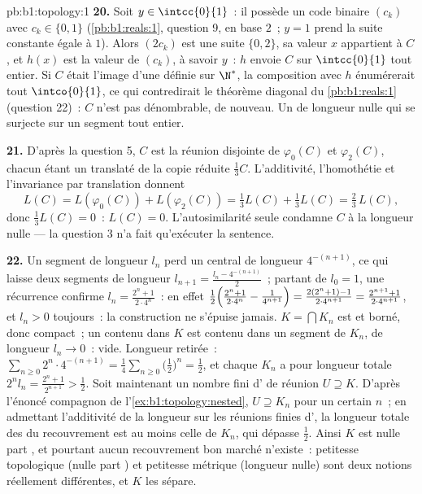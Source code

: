\begin{solution}{pb:b1:topology:1}
\textbf{20.} Soit $y \in \intcc{0}{1}$~: il possède un code binaire
$(c_k)$ avec $c_k \in \{0, 1\}$ (\cref{pb:b1:reals:1}, question
9, en base $2$~; $y = 1$ prend la suite constante égale à $1$). Alors
$(2c_k)$ est une suite $\{0,2\}$, sa valeur $x$ appartient à $C$, et
$h(x)$ est la valeur de $(c_k)$, à savoir $y$~: $h$ envoie $C$ sur
$\intcc{0}{1}$ tout entier. Si $C$ était l'image d'une 
définie sur $\N^*$, la composition avec $h$ énumérerait tout
$\intco{0}{1}$, ce qui contredirait le théorème diagonal du
\cref{pb:b1:reals:1} (question 22)~: $C$ n'est pas dénombrable, de
nouveau. Un  de longueur nulle qui se surjecte sur un segment
tout entier.

\textbf{21.} D'après la question 5, $C$ est la réunion disjointe de
$\varphi_0(C)$ et $\varphi_2(C)$, chacun étant un translaté de la
copie réduite $\frac13 C$. L'additivité, l'homothétie et l'invariance
par translation donnent
\[
L(C) = L(\varphi_0(C)) + L(\varphi_2(C))
= \tfrac13 L(C) + \tfrac13 L(C) = \tfrac23\,L(C),
\]
donc $\frac13 L(C) = 0$~: $L(C) = 0$. L'autosimilarité seule condamne
$C$ à la longueur nulle --- la question 3 n'a fait qu'exécuter la
sentence.

\textbf{22.} Un segment de longueur $l_n$ perd un  central
de longueur $4^{-(n+1)}$, ce qui laisse deux segments de longueur
$l_{n+1} = \frac{l_n - 4^{-(n+1)}}{2}$~; partant de $l_0 = 1$, une
récurrence confirme $l_n = \frac{2^n + 1}{2\cdot4^n}$~: en effet
$\frac12\Bigl(\frac{2^n+1}{2\cdot4^n} - \frac{1}{4^{n+1}}\Bigr)
= \frac{2(2^n + 1) - 1}{2\cdot4^{n+1}} = \frac{2^{n+1} +
1}{2\cdot4^{n+1}}$, et $l_n > 0$ toujours~: la construction ne
s'épuise jamais. $K = \bigcap K_n$ est  et borné, donc compact~;
un  contenu dans $K$ est contenu dans un segment de $K_n$,
de longueur $l_n \to 0$~:  vide. Longueur retirée~:
$\sum_{n\geq0} 2^n \cdot 4^{-(n+1)} =
\frac14\sum_{n\geq0}\bigl(\frac12\bigr)^n = \frac12$, et chaque $K_n$
a pour longueur totale $2^n l_n = \frac{2^n + 1}{2^{n+1}} >
\frac12$. Soit maintenant un nombre fini d'  de
réunion $U \supseteq K$. D'après l'énoncé compagnon de
l'\cref{ex:b1:topology:nested}, $U \supseteq K_n$ pour un certain $n$~;
en admettant l'additivité de la longueur sur les réunions finies
d', la longueur totale des  du recouvrement est
au moins celle de $K_n$, qui dépasse $\frac12$. Ainsi $K$ est nulle
part , et pourtant aucun recouvrement bon marché n'existe~:
petitesse topologique (nulle part ) et petitesse métrique
(longueur nulle) sont deux notions réellement différentes, et $K$ les
sépare.


\end{solution}
